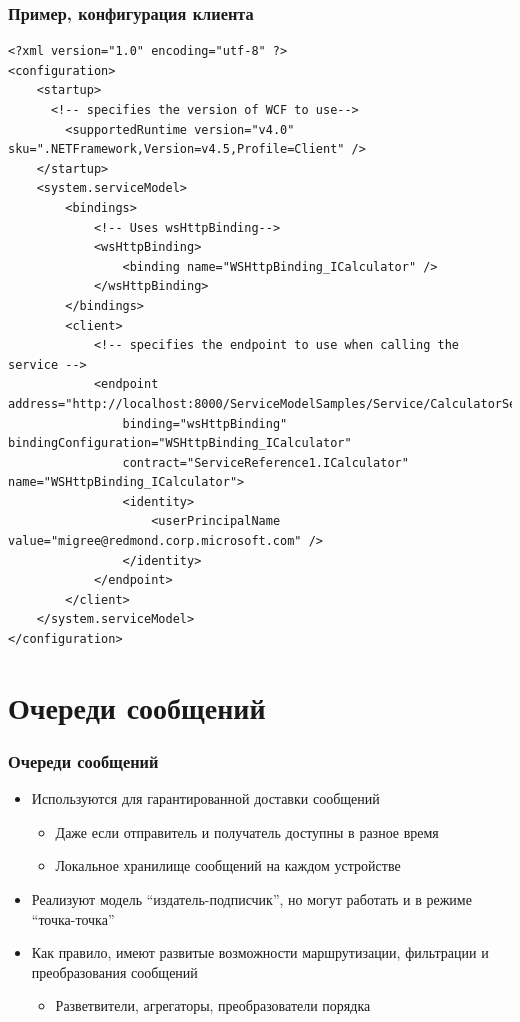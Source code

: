 \documentclass[xetex,mathserif,serif]{beamer}
\begin{document}
	\begin{frame}[fragile]
		\frametitle{Пример, конфигурация клиента}
		\begin{ssmall}
			\begin{verbatim}
<?xml version="1.0" encoding="utf-8" ?>  
<configuration>  
    <startup>   
      <!-- specifies the version of WCF to use-->  
        <supportedRuntime version="v4.0" sku=".NETFramework,Version=v4.5,Profile=Client" />  
    </startup>  
    <system.serviceModel>  
        <bindings>  
            <!-- Uses wsHttpBinding-->  
            <wsHttpBinding>  
                <binding name="WSHttpBinding_ICalculator" />  
            </wsHttpBinding>  
        </bindings>  
        <client>  
            <!-- specifies the endpoint to use when calling the service -->  
            <endpoint address="http://localhost:8000/ServiceModelSamples/Service/CalculatorService"  
                binding="wsHttpBinding" bindingConfiguration="WSHttpBinding_ICalculator"  
                contract="ServiceReference1.ICalculator" name="WSHttpBinding_ICalculator">  
                <identity>  
                    <userPrincipalName value="migree@redmond.corp.microsoft.com" />  
                </identity>  
            </endpoint>  
        </client>  
    </system.serviceModel>  
</configuration>
			\end{verbatim}
		\end{ssmall}
	\end{frame}

	\section{Очереди сообщений}

	\begin{frame}
		\frametitle{Очереди сообщений}
		\begin{itemize}
			\item Используются для гарантированной доставки сообщений
			\begin{itemize}
				\item Даже если отправитель и получатель доступны в разное время
				\item Локальное хранилище сообщений на каждом устройстве
			\end{itemize}
			\item Реализуют модель ``издатель-подписчик'', но могут работать и в режиме ``точка-точка''
			\item Как правило, имеют развитые возможности маршрутизации, фильтрации и преобразования сообщений
			\begin{itemize}
				\item Разветвители, агрегаторы, преобразователи порядка
			\end{itemize}
		\end{itemize}
	\end{frame}
\end{document}
